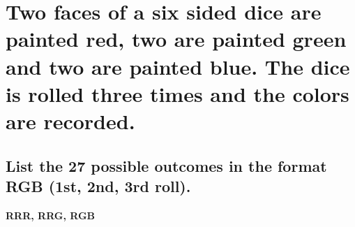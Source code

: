 \documentclass{article}
\begin{document}

\section{Two faces of a six sided dice are painted red, two are painted green
    and two are painted blue. The dice is rolled three times and the colors are recorded.}
\subsection{List the 27 possible outcomes in the format RGB (1st, 2nd, 3rd roll).}
\hspace{1cm}\textbf{RRR, RRG, RGB}
\end{document}
